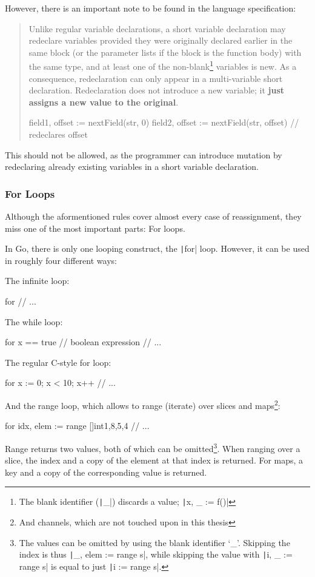 However, there is an important note to be found in the language specification:

\begin{quote}
Unlike regular variable declarations, a short variable declaration may redeclare
variables provided they were originally declared earlier in the same block (or
the parameter lists if the block is the function body) with the same type, and
at least one of the non-blank\footnote{The blank identifier (\texttt|_|)
    discards a value; \texttt|x, _ := f()|} variables is new. As a consequence, redeclaration
can only appear in a multi-variable short declaration. Redeclaration does not
introduce a new variable; it \textbf{just assigns a new value to the original}.
    \begin{gocode}
field1, offset := nextField(str, 0)
field2, offset := nextField(str, offset)  // redeclares offset
    \end{gocode}
\autocite{short-hand-decl}
\end{quote}

This should not be allowed, as the programmer can introduce mutation by redeclaring
already existing variables in a short variable declaration.

\subsubsection{For Loops}

Although the aformentioned rules cover almost every case of reassignment, they miss
one of the most important parts: For loops.

In Go, there is only one looping construct, the \texttt|for| loop. However, it can
be used in roughly four different ways:

The infinite loop:
\begin{gocode}
for {
	// ...
}
\end{gocode}
The while loop:
\begin{gocode}
for x == true { // boolean expression
	// ...
}
\end{gocode}
The regular C-style for loop:
\begin{gocode}
for x := 0; x < 10; x++ {
	// ...
}
\end{gocode}
And the range loop, which allows to range (iterate) over slices and maps\footnote{And
channels, which are not touched upon in this thesis}:
\begin{gocode}
for idx, elem := range []int{1,8,5,4} {
	// ...
}
\end{gocode}
Range returns two values, both of which can be omitted\footnote{The values can be omitted
    by using the blank identifier `\_'. Skipping the index is thus
    \texttt|_, elem := range s|, while skipping the value with
\texttt|i, _ := range s| is equal to just \texttt|i := range s|.}. When
ranging over a slice, the index and a copy of the element at that index is returned. For
maps, a key and a copy of the corresponding value is returned.

